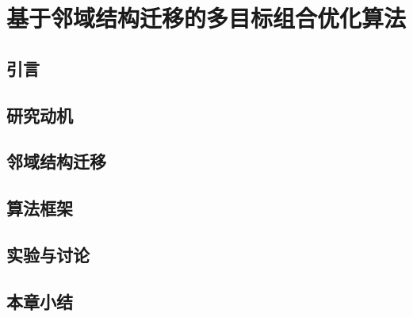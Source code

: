 \chapter{基于邻域结构迁移的多目标组合优化算法}
\label{chap:NST}

\section{引言}
\label{sec:NST:引言}

\section{研究动机}
\label{sec:NST:研究动机}

\section{邻域结构迁移}
\label{sec:NST:邻域结构迁移}

\section{算法框架}
\label{sec:NST:算法框架}

\section{实验与讨论}
\label{sec:NST:实验与讨论}

\section{本章小结}
\label{sec:NST:本章小结}